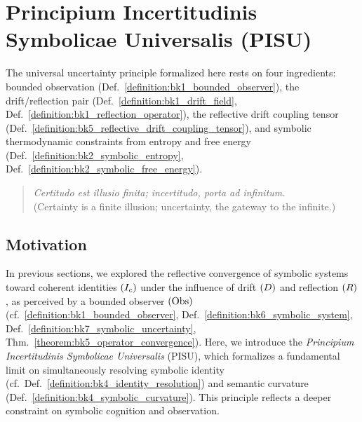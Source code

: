 \section{Principium Incertitudinis Symbolicae Universalis (PISU)}
\label{sec:bk7_pisu_universal_symbolic_uncertainty}

The universal uncertainty principle formalized here rests on four ingredients:
bounded observation (Def.~\ref{definition:bk1_bounded_observer}), the
drift/reflection pair (Def.~\ref{definition:bk1_drift_field},
Def.~\ref{definition:bk1_reflection_operator}), the reflective drift coupling
tensor (Def.~\ref{definition:bk5_reflective_drift_coupling_tensor}), and
symbolic thermodynamic constraints from entropy and free energy
(Def.~\ref{definition:bk2_symbolic_entropy},
Def.~\ref{definition:bk2_symbolic_free_energy}).

\begin{quote}
\textit{Certitudo est illusio finita; incertitudo, porta ad infinitum.}\\
(Certainty is a finite illusion; uncertainty, the gateway to the infinite.)
\end{quote}

\subsection{Motivation}
\label{subsec:bk7_pisu_motivation}
In previous sections, we explored the reflective convergence of symbolic systems toward coherent identities $(I_c)$ under the influence of drift $(D)$ and reflection $(R)$, as perceived by a bounded observer $(\mathrm{Obs})$ (cf.~\ref{definition:bk1_bounded_observer}, Def.~\ref{definition:bk6_symbolic_system}, Def.~\ref{definition:bk7_symbolic_uncertainty}, Thm.~\ref{theorem:bk5_operator_convergence}). Here, we introduce the \emph{Principium Incertitudinis Symbolicae Universalis} (PISU), which formalizes a fundamental limit on simultaneously resolving symbolic identity (cf.~Def.~\ref{definition:bk4_identity_resolution}) and semantic curvature (Def.~\ref{definition:bk4_symbolic_curvature}). This principle reflects a deeper constraint on symbolic cognition and observation.

